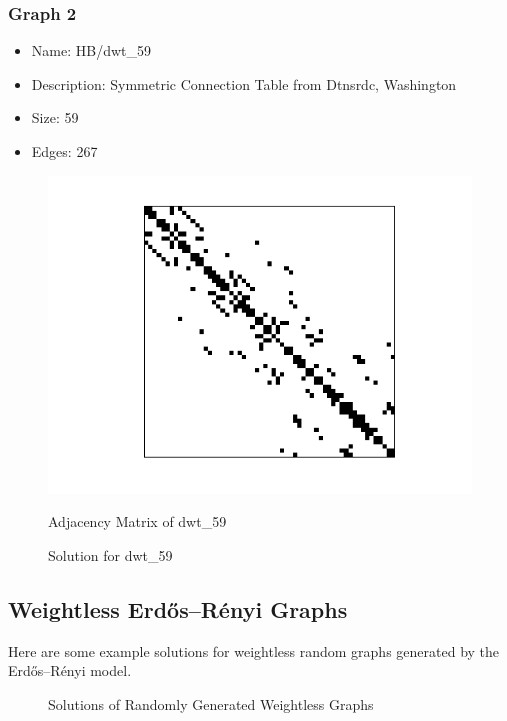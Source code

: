 \documentclass[a4paper,12pt]{report}
\begin{document}
\subsubsection{Graph 2}
\begin{itemize}
	\item Name: HB/dwt\_59
	\item Description: Symmetric Connection Table from Dtnsrdc, Washington
	\item Size: 59
	\item Edges: 267
\end{itemize}

\begin{figure}[H]
    \centering
    \begin{minipage}{.5\textwidth}
        \centering
	\includegraphics[width=.9\linewidth]{dwt_59-adjacency}
        \caption{Adjacency Matrix of dwt\_59}
        \label{fig:adjacency-2}
    \end{minipage}%
    \begin{minipage}{0.5\textwidth}
        \centering
	
        \caption{Solution for dwt\_59}
        \label{fig:sol2}
    \end{minipage}
\end{figure}

\subsection{Weightless Erdős–Rényi Graphs}

Here are some example solutions for weightless random graphs generated by the Erdős–Rényi model.

\begin{figure}[H]
    \centering
    \begin{minipage}{.5\textwidth}
        \centering
	
    \end{minipage}%
    \begin{minipage}{0.5\textwidth}
        \centering
	
    \end{minipage}
\caption{Solutions of Randomly Generated Weightless Graphs}
\end{figure}
\end{document}
